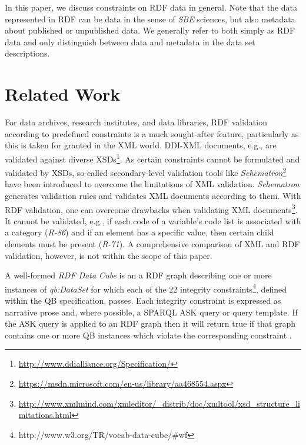 \documentclass[conference]{IEEEtran}
\begin{document}
In this paper, we discuss constraints on RDF data in general. Note that the data represented in RDF can be data in the sense of \emph{SBE} sciences, but also metadata about published or unpublished data. We generally refer to both simply as RDF data and only distinguish between data and metadata in the data set descriptions. 


\section{Related Work}
\label{related-work}

For data archives, research institutes, and data libraries,
RDF validation according to predefined constraints is a much sought-after feature, 
particularly as this is taken for granted in the XML world.
DDI-XML documents, e.g., are validated against diverse XSDs\footnote{\url{http://www.ddialliance.org/Specification/}}.
As certain constraints cannot be formulated and validated by XSDs, 
so-called secondary-level validation tools like \emph{Schematron}\footnote{\url{https://msdn.microsoft.com/en-us/library/aa468554.aspx}} 
have been introduced to overcome the limitations of XML validation.
\emph{Schematron} generates validation rules and validates XML documents according to them.
With RDF validation, one can overcome drawbacks when validating XML documents\footnote{\url{http://www.xmlmind.com/xmleditor/_distrib/doc/xmltool/xsd_structure_limitations.html}}.
It cannot be validated, e.g., if each code of a variable's code list is associated with a category (\emph{R-86}) and if an element has a specific value, then certain child elements must be present (\emph{R-71}).  
A comprehensive comparison of XML and RDF validation, however, is not within the scope of this paper.


A well-formed \emph{RDF Data Cube} is an a RDF graph describing one or more instances of \emph{qb:DataSet} for which each of the 22 integrity constraints\footnote{http://www.w3.org/TR/vocab-data-cube/\#wf}, defined within the QB specification, passes.
Each integrity constraint is expressed as narrative prose and, where possible, a SPARQL ASK query or query template. 
If the ASK query is applied to an RDF graph then it will return true if that graph contains one or more QB instances which violate the corresponding constraint \cite{CyganiakReynolds2014}.
\end{document}
